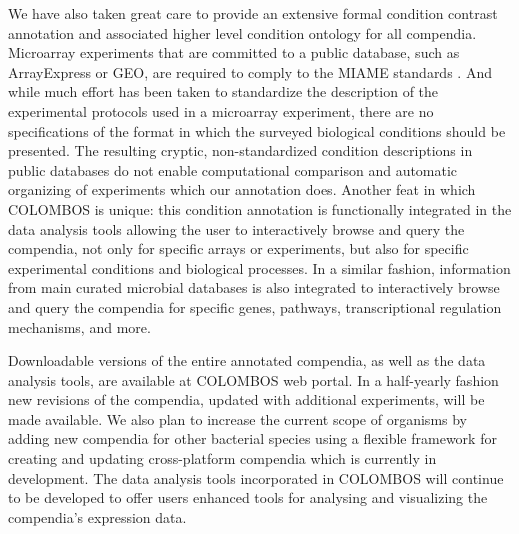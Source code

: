 We have also taken great care to provide an extensive formal condition contrast annotation and associated higher level condition ontology for all compendia. Microarray experiments that are committed to a public database, such as ArrayExpress or GEO, are required to comply to the MIAME standards \cite{Brazma2001, Brazma2009}. And while much effort has been taken to standardize the description of the experimental protocols used in a microarray experiment, there are no specifications of the format in which the surveyed biological conditions should be presented. The resulting cryptic, non-standardized condition descriptions in public databases do not enable computational comparison and automatic organizing of experiments which our annotation does. Another feat in which COLOMBOS is unique: this condition annotation is functionally integrated in the data analysis tools allowing the user to interactively browse and query the compendia, not only for specific arrays or experiments, but also for specific experimental conditions and biological processes. In a similar fashion, information from main curated microbial databases is also integrated to interactively browse and query the compendia for specific genes, pathways, transcriptional regulation mechanisms, and more. 

Downloadable versions of the entire annotated compendia, as well as the 
data analysis tools, are available at COLOMBOS web portal\cite{COLOMBOS}. 
In a half-yearly fashion new 
revisions of the compendia, updated with additional experiments, will be made 
available. We also plan to increase the current scope of organisms by adding 
new compendia for other bacterial species using a flexible framework for 
creating and updating cross-platform compendia which is currently in 
development. The data analysis tools incorporated in COLOMBOS will continue to 
be developed to offer users enhanced tools for analysing and visualizing the 
compendia's expression data.







\cleardoublepage


